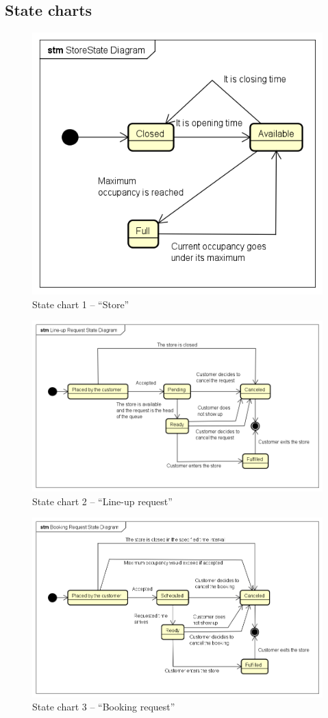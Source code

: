 \documentclass[a4paper,oneside,11pt]{book}   %
\begin{document}
    \subsection{State charts}
    \begin{figure}[H]
        \centering
        \includegraphics[width=.6\textwidth, keepaspectratio]{pictures/state_diagrams/store}
        \caption{State chart 1 -- ``Store''}
        \label{figure:state_chart_1_store}
    \end{figure}
    \begin{figure}[H]
        \centering
        \includegraphics[width=.85\textwidth, keepaspectratio]{pictures/state_diagrams/line-up_request}
        \caption{State chart 2 -- ``Line-up request''}
        \label{figure:state_chart_2_lineup_request}
    \end{figure}
    \begin{figure}[H]
        \centering
        \includegraphics[width=.85\textwidth, keepaspectratio]{pictures/state_diagrams/booking_request}
        \caption{State chart 3 -- ``Booking request''}
        \label{figure:state_chart_3_booking_request}
    \end{figure}
\end{document}
